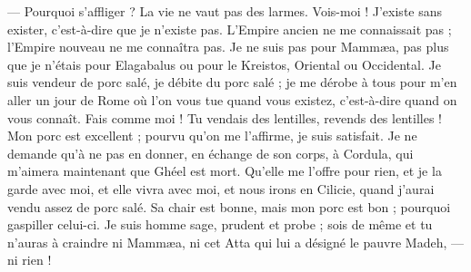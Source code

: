 \documentclass[a4paper, 11pt, oneside, polutonikogreek, french]{article}
\begin{document}
--- Pourquoi s'affliger ? La vie ne vaut pas des larmes. Vois-moi ! J'existe sans exister, c'est-à-dire que je n'existe pas. L'Empire ancien ne me connaissait pas ; l'Empire nouveau ne me connaîtra pas. Je ne suis pas pour Mammæa, pas plus que je n'étais pour Elagabalus ou pour le Kreistos, Oriental ou Occidental. Je suis vendeur de porc salé, je débite du porc salé ; je me dérobe à tous pour m'en aller un jour de Rome où l'on vous tue quand vous existez, c'est-à-dire quand on vous connaît. Fais comme moi ! Tu vendais des lentilles, revends des lentilles ! Mon porc est excellent ; pourvu qu'on me l'affirme, je suis satisfait. Je ne demande qu'à ne pas en donner, en échange de son corps, à Cordula, qui m'aimera maintenant que Ghéel est mort. Qu'elle me l'offre pour rien, et je la garde avec moi, et elle vivra avec moi, et nous irons en Cilicie, quand j'aurai vendu assez de porc salé. Sa chair est bonne, mais mon porc est bon ; pourquoi gaspiller celui-ci. Je suis homme sage, prudent et probe ; sois de même et tu n'auras à craindre ni Mammæa, ni cet Atta qui lui a désigné le pauvre Madeh, --- ni rien !
\clearpage
\end{document}
